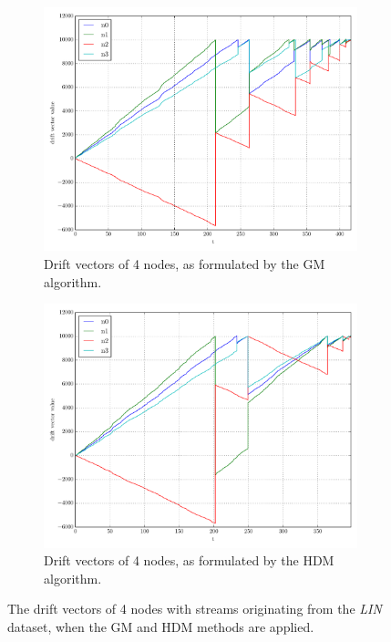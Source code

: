\begin{figure}[!h]
\begin{subfigure}{0.49\textwidth}
  \includegraphics[width=\linewidth]{img/main_classic_drifts_linear4N.pdf}
  \caption{Drift vectors of 4 nodes, as formulated by the GM algorithm.}
\end{subfigure}\hfill
\begin{subfigure}{0.49\textwidth}
  \includegraphics[width=\linewidth]{img/main_heuristic_drifts_linear4N.pdf}
  \caption{Drift vectors of 4 nodes, as formulated by the HDM algorithm.}
\end{subfigure}\hfill
\vspace{0.5cm}
\caption{The drift vectors of 4 nodes with streams originating from the \emph{LIN} dataset, when the GM and HDM methods are applied.} \label{fig:mainComp-drifts}
\end{figure}

